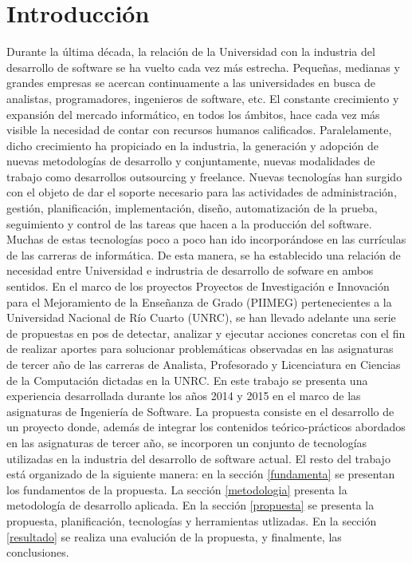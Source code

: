 \section{Introducción}
Durante la última década, la relación de la Universidad con la  industria del desarrollo de software se ha vuelto cada vez más estrecha. Pequeñas, medianas y grandes empresas se acercan continuamente a las universidades en busca de analistas, programadores, ingenieros de software, etc.
El constante crecimiento y expansión del mercado informático, en todos los ámbitos, hace cada vez más visible la necesidad de contar con 
recursos humanos calificados. Paralelamente, dicho crecimiento ha propiciado en la industria, la generación y adopción de nuevas 
metodologías de desarrollo y conjuntamente, nuevas modalidades de trabajo como desarrollos outsourcing y freelance.
Nuevas tecnologías han surgido con el objeto de dar el soporte necesario para las actividades de administración, 
gestión, planificación, implementación, diseño, automatización de la prueba, seguimiento y control de las tareas que hacen a la producción 
del software. Muchas de estas tecnologías poco a poco han ido  incorporándose en las currículas de las carreras de informática. 
De esta manera, se ha establecido una relación de necesidad entre Universidad e indrustria de desarrollo de sofware en ambos sentidos.
En el marco de los proyectos Proyectos de Investigación e Innovación para el Mejoramiento de la Enseñanza de Grado (PIIMEG)\cite{piimeg} 
pertenecientes a la Universidad Nacional de Río Cuarto (UNRC), se han llevado adelante una serie de propuestas en pos de detectar, analizar y ejecutar 
acciones concretas con el fin de realizar aportes para solucionar problemáticas observadas en las asignaturas de tercer año de las carreras de 
Analista, Profesorado y Licenciatura en Ciencias de la Computación dictadas en la UNRC. 
En este trabajo se presenta una experiencia desarrollada durante los años 2014 y 2015 en el marco de las asignaturas de Ingeniería de Software. 
La propuesta consiste en el desarrollo de un proyecto donde, además de integrar los contenidos teórico-prácticos abordados en las 
asignaturas de tercer año, se incorporen un conjunto de tecnologías utilizadas en la industria del desarrollo de software actual. 
El resto del trabajo está organizado de la siguiente manera: en la sección \ref{fundamenta} se presentan los 
fundamentos de la propuesta. La sección \ref{metodologia} presenta la metodología de desarrollo aplicada. 
En la sección \ref{propuesta} se presenta la propuesta, planificación, 
tecnologías y herramientas utlizadas. En la sección \ref{resultado} se realiza una evalución de la propuesta, 
y finalmente, las conclusiones.